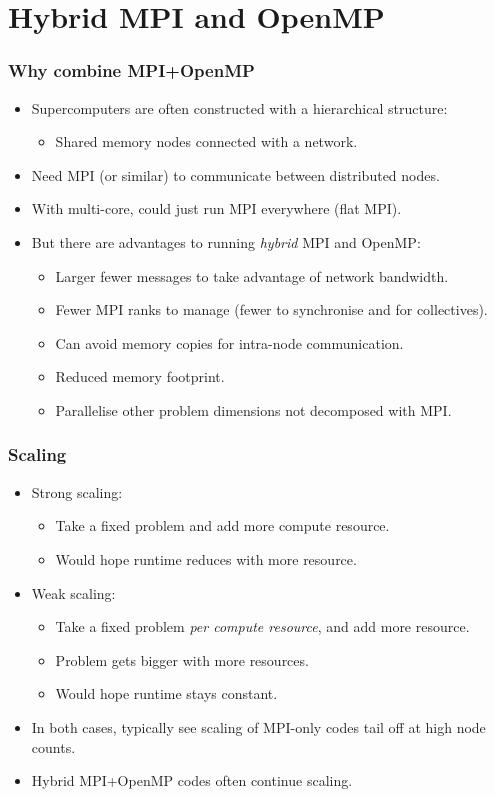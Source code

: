 \documentclass{beamer}
\begin{document}
\section{Hybrid MPI and OpenMP}
\begin{frame}
\frametitle{Why combine MPI+OpenMP}
\begin{itemize}
  \item Supercomputers are often constructed with a hierarchical structure:
    \begin{itemize}
      \item Shared memory nodes connected with a network.
    \end{itemize}
  \item Need MPI (or similar) to communicate between distributed nodes.
  \item With multi-core, could just run MPI everywhere (flat MPI).
  \item But there are advantages to running \emph{hybrid} MPI and OpenMP:
    \begin{itemize}
      \item Larger fewer messages to take advantage of network bandwidth.
      \item Fewer MPI ranks to manage (fewer to synchronise and for collectives).
      \item Can avoid memory copies for intra-node communication.
      \item Reduced memory footprint.
      \item Parallelise other problem dimensions not decomposed with MPI.
    \end{itemize}
\end{itemize}
\end{frame}

\begin{frame}
\frametitle{Scaling}
\begin{itemize}
  \item Strong scaling:
    \begin{itemize}
      \item Take a fixed problem and add more compute resource.
      \item Would hope runtime reduces with more resource.
    \end{itemize}
  \item Weak scaling:
    \begin{itemize}
      \item Take a fixed problem \emph{per compute resource}, and add more resource.
      \item Problem gets bigger with more resources.
      \item Would hope runtime stays constant.
    \end{itemize}
  \item In both cases, typically see scaling of MPI-only codes tail off at high node counts.
  \item Hybrid MPI+OpenMP codes often continue scaling.
\end{itemize}
\end{frame}
\end{document}
